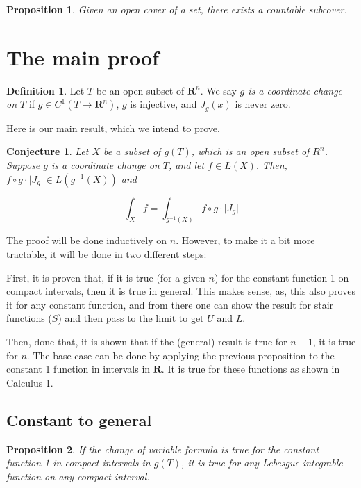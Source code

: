 \documentclass[11pt]{article}
\theoremstyle{definition}
\newtheorem{definition}{Definition}
\theoremstyle{plain}
\newtheorem{prop}{Proposition}
\newtheorem*{conj}{Conjecture}
\newcommand{\R}{\mathbf{R}}
\newcommand{\mo}{^{-1}}
\begin{document}
\begin{prop}
Given an open cover of a set, there exists a countable subcover.
\end{prop}

\section{The main proof}

\begin{definition}
Let $T$ be an open subset of $\R^n$. We say \emph{$g$ is a coordinate change on $T$} if $g \in C^1(T \rightarrow \R^n)$, $g$ is injective, and $J_g(x)$ is never zero.
\end{definition}

Here is our main result, which we intend to prove.

\begin{conj}
Let $X$ be a subset of $g(T)$, which is an open subset of $R^n$. Suppose $g$ is a coordinate change on $T$, and let $f \in L(X)$. Then, ${f \circ g \cdot \lvert J_g \rvert \in L(g\mo(X))}$ and

\[ \int_{X} f =  \int_{g\mo(X)} f \circ g \cdot \lvert J_g \rvert \]
\end{conj}

The proof will be done inductively on $n$. However, to make it a bit more tractable, it will be done in two different steps:

First, it is proven that, if it is true (for a given $n$) for the constant function 1 on compact intervals, then it is true in general. This makes sense, as, this also proves it for any constant function, and from there one can show the result for stair functions ($S$) and then pass to the limit to get $U$ and $L$.

Then, done that, it is shown that if the (general) result is true for $n-1$, it is true for $n$. The base case can be done by applying the previous proposition to the constant 1 function in intervals in $\R$. It is true for these functions as shown in Calculus 1.

\subsection{Constant to general}

\begin{prop}
If the change of variable formula is true for the constant function 1 in compact intervals in $g(T)$, it is true for any Lebesgue-integrable function on any compact interval.
\end{prop}
\end{document}
